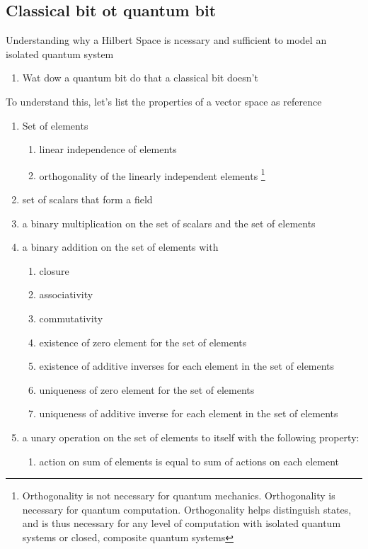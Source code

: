 \documentclass[a4paper,12pt]{amsbook}
\newcommand{\0}{{$|0\rangle$}}
\newcommand{\1}{{$|1\rangle$}}
\begin{document}
\begin{enumerate}
\chapter{Classical bit ot quantum bit}
Understanding why a Hilbert Space is ncessary and sufficient to model an isolated quantum system
\begin{enumerate}
\item Wat dow a quantum bit do that a classical bit doesn't
\end{enumerate}
To understand this, let's list the properties of a vector space as reference
   
\begin{enumerate}
  \item Set of elements
  \begin{enumerate}
  \item linear independence of elements
  \item orthogonality of the linearly independent elements \footnote{Orthogonality is not necessary for quantum mechanics. Orthogonality is necessary for quantum computation. Orthogonality helps distinguish states, and is thus necessary for any level of computation with isolated quantum systems or closed, composite quantum systems}
  \end{enumerate}
  \item set of scalars that form a field
  \item a binary multiplication on the set of scalars and the set of elements 
  \item a binary addition on the set of elements with
  \begin{enumerate}
  \item closure
  \item associativity
  \item commutativity
  \item existence of zero element for the set of elements
  \item existence of additive inverses for each element in the set of elements
  \item uniqueness of zero element for the set of elements
  \item uniqueness of additive inverse for each element in the set of elements 
  \end{enumerate}
  \item a unary operation on the set of elements to itself with the following property:
  \begin{enumerate}
  \item action on sum of elements is equal to sum of actions on each element
  \end{enumerate}
  \end{enumerate}
   

\end{enumerate}
\end{document}

